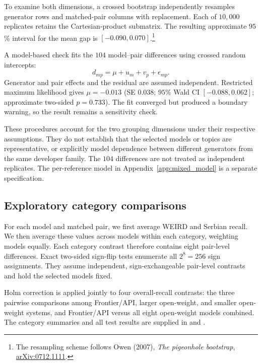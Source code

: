 \documentclass[11pt,a4paper]{article}
\begin{document}
To examine both dimensions, a crossed bootstrap independently resamples generator rows and matched-pair columns with replacement. Each of $10{,}000$ replicates retains the Cartesian-product submatrix. The resulting approximate $95$\% interval for the mean gap is $[-0.090,0.070]$.\footnote{The resampling scheme follows Owen (2007), \emph{The pigeonhole bootstrap}, \href{https://arxiv.org/abs/0712.1111}{arXiv:0712.1111}.}

A model-based check fits the $104$ model--pair differences using crossed random intercepts:
\begin{equation}
d_{mp}=\mu+u_m+v_p+\epsilon_{mp}.
\label{eq:crossed}
\end{equation}
Generator and pair effects and the residual are assumed independent. Restricted maximum likelihood gives $\mu=-0.013$ (SE $0.038$; $95$\% Wald CI $[-0.088,0.062]$; approximate two-sided $p=0.733$). The fit converged but produced a boundary warning, so the result remains a sensitivity check.

These procedures account for the two grouping dimensions under their respective assumptions. They do not establish that the selected models or topics are representative, or explicitly model dependence between different generators from the same developer family. The $104$ differences are not treated as independent replicates. The per-reference model in Appendix~\ref{app:mixed_model} is a separate specification.

\subsection{Exploratory category comparisons}
\label{app:category-tests}
For each model and matched pair, we first average WEIRD and Serbian recall. We then average these values across models within each category, weighting models equally. Each category contrast therefore contains eight pair-level differences. Exact two-sided sign-flip tests enumerate all $2^8=256$ sign assignments. They assume independent, sign-exchangeable pair-level contrasts and hold the selected models fixed.

Holm correction is applied jointly to four overall-recall contrasts: the three pairwise comparisons among Frontier/API, larger open-weight, and smaller open-weight systems, and Frontier/API versus all eight open-weight models combined. The category summaries and all test results are supplied in  and .
\end{document}
